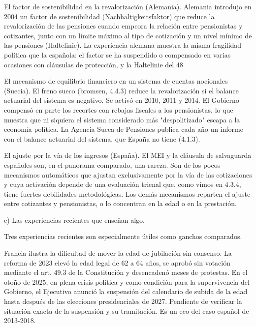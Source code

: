 \documentclass[10pt,a4paper]{article}
\begin{document}
El factor de sostenibilidad en la revalorización (Alemania). Alemania introdujo en 2004 un factor de sostenibilidad (Nachhaltigkeitsfaktor) que reduce la revalorización de las pensiones cuando empeora la relación entre pensionistas y cotizantes, junto con un límite máximo al tipo de cotización y un nivel mínimo de las pensiones (Haltelinie). La experiencia alemana muestra la misma fragilidad política que la española: el factor se ha suspendido o compensado en varias ocasiones con cláusulas de protección, y la Haltelinie del 48%

El mecanismo de equilibrio financiero en un sistema de cuentas nocionales (Suecia). El freno sueco (bromsen, 4.4.3) reduce la revalorización si el balance actuarial del sistema es negativo. Se activó en 2010, 2011 y 2014. El Gobierno compensó en parte los recortes con rebajas fiscales a los pensionistas, lo que muestra que ni siquiera el sistema considerado más "despolitizado" escapa a la economía política. La Agencia Sueca de Pensiones publica cada año un informe con el balance actuarial del sistema, que España no tiene (4.1.3).

El ajuste por la vía de los ingresos (España). El MEI y la cláusula de salvaguarda españoles son, en el panorama comparado, una rareza. Son de los pocos mecanismos automáticos que ajustan exclusivamente por la vía de las cotizaciones y cuya activación depende de una evaluación trienal que, como vimos en 4.3.4, tiene fuertes debilidades metodológicas. Los demás mecanismos reparten el ajuste entre cotizantes y pensionistas, o lo concentran en la edad o en la prestación.

c) Las experiencias recientes que enseñan algo.

Tres experiencias recientes son especialmente útiles como ganchos comparados.

Francia ilustra la dificultad de mover la edad de jubilación sin consenso. La reforma de 2023 elevó la edad legal de 62 a 64 años, se aprobó sin votación mediante el art. 49.3 de la Constitución y desencadenó meses de protestas. En el otoño de 2025, en plena crisis política y como condición para la supervivencia del Gobierno, el Ejecutivo anunció la suspensión del calendario de subida de la edad hasta después de las elecciones presidenciales de 2027. Pendiente de verificar la situación exacta de la suspensión y su tramitación. Es un eco del caso español de 2013-2018.
\end{document}
